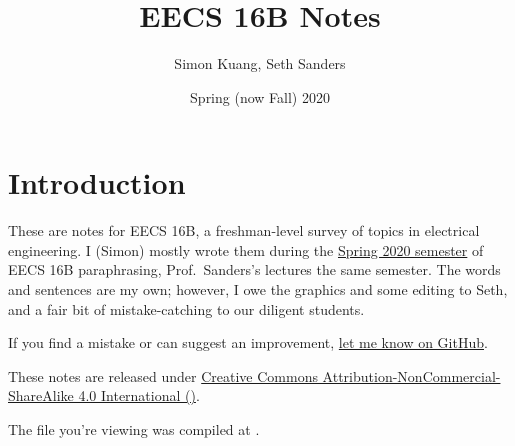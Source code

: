 \documentclass{../content16b}
\begin{document}
\title{EECS 16B Notes}
\author{Simon Kuang, Seth Sanders}
\date{Spring (now Fall) 2020}
\frontmatter
\maketitle

\section{Introduction}
These are notes for EECS 16B, a freshman-level survey of topics in electrical engineering. I (Simon) mostly wrote them during the \href{https://inst.eecs.berkeley.edu/~ee16b/sp20/}{Spring 2020 semester} of EECS 16B paraphrasing, Prof.~Sanders's lectures the same semester.
The words and sentences are my own; however, I owe the graphics and some editing to Seth, and a fair bit of mistake-catching to our diligent students.

If you find a mistake or can suggest an improvement, \href{https://github.com/simontheflutist/eecs16b-notes}{let me know on GitHub}.

These notes are released under \href{https://creativecommons.org/licenses/by-nc-sa/4.0/}{Creative Commons Attribution-NonCommercial-ShareAlike 4.0 International (\ccbyncsa)}.

The file you're viewing was compiled at \DTMnow.

\newpage
\tableofcontents
\newpage
\listoffigures

\mainmatter
\renewcommand{\printchaptername}{\chapnamefont Lecture}










\end{document}
